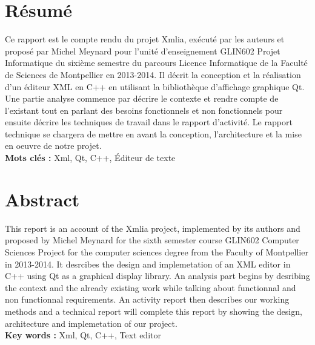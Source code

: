 \documentclass [a4 paper,11pt]{report}
\begin{document}
\section*{Résumé}
Ce rapport est le compte rendu du projet Xmlia, exécuté par les auteurs et proposé par Michel Meynard pour l’unité d’enseignement GLIN602 Projet Informatique du sixième semestre du parcours Licence Informatique de la Faculté de Sciences de Montpellier en 2013-2014. Il décrit la conception et la réalisation d'un éditeur XML en C++ en utilisant la bibliothèque d'affichage graphique Qt. Une partie analyse commence par décrire le contexte et rendre compte de l'existant tout en parlant des besoins fonctionnels et non fonctionnels pour ensuite décrire les techniques de travail dans le rapport d'activité. Le rapport technique se chargera de mettre en avant la conception, l'architecture et la mise en oeuvre de notre projet. \\

\textbf{Mots clés : } Xml, Qt, C++, Éditeur de texte

\section*{Abstract}
This report is an account of the Xmlia project, implemented by its authors and proposed by Michel Meynard for the sixth semester course GLIN602 Computer Sciences Project for the computer sciences degree from the Faculty of Montpellier in 2013-2014. It desrcibes the design and implemetation of an XML editor in C++ using Qt as a graphical display library. An analysis part begins by desribing the context and the already existing work while talking about functionnal and non functionnal requirements. An activity report then describes our working methods and a technical report will complete this report by showing the design, architecture and implemetation of our project. \\

\textbf{Key words : } Xml, Qt, C++, Text editor


\end{document}
